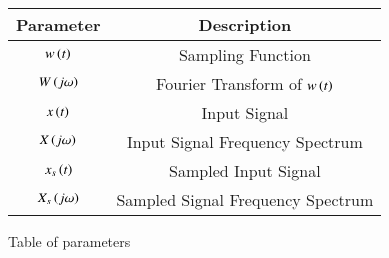 \renewcommand\thetable{1}
\begin{tabular}{|c|c|}
    \hline 
    \textbf{Parameter}&\textbf{Description} \\
    \hline
    $w\left(t\right)$ & Sampling Function \\
    \hline
	$W\left(j\omega\right)$ & Fourier Transform of $w\left(t\right)$ \\
    \hline
    $x\left(t\right)$ & Input Signal \\
    \hline
    $X\left(j\omega\right)$ & Input Signal Frequency Spectrum \\
    \hline
    $x_s\left(t\right)$ & Sampled Input Signal \\
    \hline
    $X_s\left(j\omega\right)$ & Sampled Signal Frequency Spectrum \\
    \hline
\end{tabular}

\caption{Table of parameters}
\label{Table:1}

